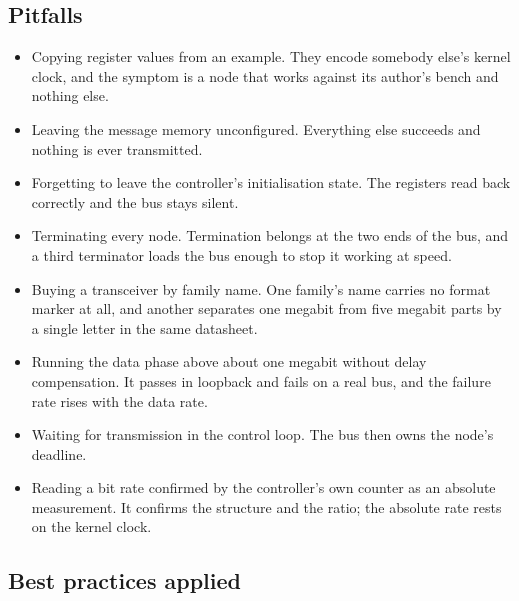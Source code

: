 \subsection*{Pitfalls}

\begin{itemize}
\item Copying register values from an example. They encode somebody else's
kernel clock, and the symptom is a node that works against its author's bench
and nothing else.
\item Leaving the message memory unconfigured. Everything else succeeds and
nothing is ever transmitted.
\item Forgetting to leave the controller's initialisation state. The registers
read back correctly and the bus stays silent.
\item Terminating every node. Termination belongs at the two ends of the bus,
and a third terminator loads the bus enough to stop it working at speed.
\item Buying a transceiver by family name. One family's name carries no format
marker at all, and another separates one megabit from five megabit parts by a
single letter in the same datasheet.
\item Running the data phase above about one megabit without delay
compensation. It passes in loopback and fails on a real bus, and the failure
rate rises with the data rate.
\item Waiting for transmission in the control loop. The bus then owns the
node's deadline.
\item Reading a bit rate confirmed by the controller's own counter as an
absolute measurement. It confirms the structure and the ratio; the absolute rate
rests on the kernel clock.
\end{itemize}

\subsection*{Best practices applied}

